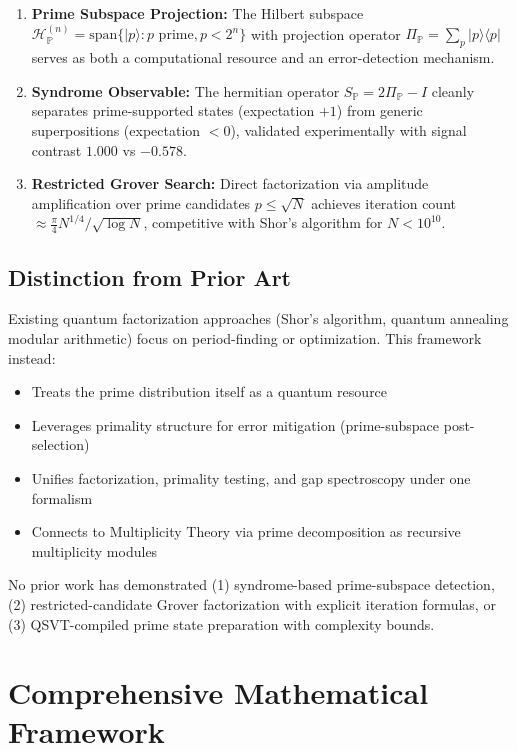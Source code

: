 \documentclass[11pt,letterpaper]{article}
\begin{document}
\begin{enumerate}
\item \textbf{Prime Subspace Projection:} The Hilbert subspace $\mathcal{H}_{\mathbb{P}}^{(n)} = \text{span}\{|p\rangle : p \text{ prime}, p < 2^n\}$ with projection operator $\Pi_{\mathbb{P}} = \sum_p |p\rangle\langle p|$ serves as both a computational resource and an error-detection mechanism.

\item \textbf{Syndrome Observable:} The hermitian operator $S_{\mathbb{P}} = 2\Pi_{\mathbb{P}} - I$ cleanly separates prime-supported states (expectation $+1$) from generic superpositions (expectation $< 0$), validated experimentally with signal contrast $1.000$ vs $-0.578$.

\item \textbf{Restricted Grover Search:} Direct factorization via amplitude amplification over prime candidates $p \leq \sqrt{N}$ achieves iteration count $\approx \frac{\pi}{4}N^{1/4}/\sqrt{\log N}$, competitive with Shor's algorithm for $N < 10^{10}$.
\end{enumerate}

\subsection{Distinction from Prior Art}

Existing quantum factorization approaches (Shor's algorithm, quantum annealing modular arithmetic) focus on period-finding or optimization. This framework instead:

\begin{itemize}
\item Treats the prime distribution itself as a quantum resource
\item Leverages primality structure for error mitigation (prime-subspace post-selection)
\item Unifies factorization, primality testing, and gap spectroscopy under one formalism
\item Connects to Multiplicity Theory via prime decomposition as recursive multiplicity modules
\end{itemize}

No prior work has demonstrated (1) syndrome-based prime-subspace detection, (2) restricted-candidate Grover factorization with explicit iteration formulas, or (3) QSVT-compiled prime state preparation with complexity bounds.

\section{Comprehensive Mathematical Framework}
\end{document}

